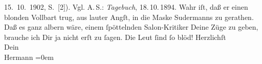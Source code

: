 \begin{ledgroupsized}[t]{13cm}
{{{                        15. 10. 1902, S. [2]). Vgl. A. S.: \emph{Tagebuch}, 18. 10. 1894}}}\label{K_L01242-2h}. Wahr iſt, daß er einen blonden Vollbart trug, aus lauter Angſt, in die Maske
                  Sudermanns zu gerathen. Daß es ganz albern
               wäre, einem ſpöttelnden Salon-Kritiker Deine Züge zu geben, brauche ich Dir ja nicht
               erſt zu ſagen. Die Leut ſind ſo blöd!\pend
           \pstart
           Herzlichſt{\\[\baselineskip]}Dein{\\[\baselineskip]}\spacefill\mbox{Hermann}\pend
           \leftskip=0em{}
         
         \endnumbering{}\end{ledgroupsized}  \newcommand{\dateiname}{L01242}\newcommand{\titel}{Hermann Bahr an Arthur Schnitzler, 15. 10. 1902}\newcommand{\editorInnen}{ Kurt Ifkovits,  Martin Anton Müller}
      